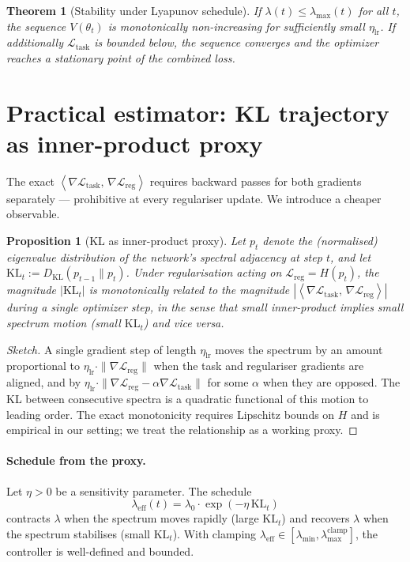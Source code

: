 \documentclass[11pt,a4paper]{article}
\newtheorem{theorem}{Theorem}
\newtheorem{proposition}{Proposition}
\newcommand{\inner}[2]{\left\langle #1,\, #2 \right\rangle}
\newcommand{\Ltask}{\mathcal{L}_{\text{task}}}
\newcommand{\Lreg}{\mathcal{L}_{\text{reg}}}
\begin{document}
\begin{theorem}[Stability under Lyapunov schedule]
\label{thm:stability}
If $\lambda(t) \leq \lambda_{\max}(t)$ for all $t$, the sequence
$V(\theta_t)$ is monotonically non-increasing for sufficiently small
$\eta_{\text{lr}}$. If additionally $\Ltask$ is bounded below, the
sequence converges and the optimizer reaches a stationary point of the
combined loss.
\end{theorem}

\section{Practical estimator: KL trajectory as inner-product proxy}

The exact $\inner{\nabla\Ltask}{\nabla\Lreg}$ requires backward
passes for both gradients separately --- prohibitive at every
regulariser update. We introduce a cheaper observable.

\begin{proposition}[KL as inner-product proxy]
\label{prop:kl-proxy}
Let $p_t$ denote the (normalised) eigenvalue distribution of the
network's spectral adjacency at step $t$, and let
$\mathrm{KL}_t := D_{\mathrm{KL}}(p_{t-1} \| p_t)$. Under regularisation
acting on $\Lreg = H(p_t)$, the magnitude $|\mathrm{KL}_t|$ is
monotonically related to the magnitude
$|\inner{\nabla\Ltask}{\nabla\Lreg}|$ during a single optimizer step,
in the sense that small inner-product implies small spectrum motion
(small $\mathrm{KL}_t$) and vice versa.
\end{proposition}

\begin{proof}[Sketch]
A single gradient step of length $\eta_{\text{lr}}$ moves the spectrum
by an amount proportional to $\eta_{\text{lr}} \cdot \|\nabla \Lreg\|$
when the task and regulariser gradients are aligned, and by
$\eta_{\text{lr}} \cdot \|\nabla \Lreg - \alpha \nabla\Ltask\|$ for
some $\alpha$ when they are opposed. The KL between consecutive
spectra is a quadratic functional of this motion to leading order.
The exact monotonicity requires Lipschitz bounds on $H$ and is
empirical in our setting; we treat the relationship as a working
proxy.
\end{proof}

\paragraph{Schedule from the proxy.}
Let $\eta > 0$ be a sensitivity parameter. The schedule
\begin{equation}
\lambda_{\text{eff}}(t) = \lambda_0 \cdot \exp(-\eta\, \mathrm{KL}_t)
\label{eq:schedule}
\end{equation}
contracts $\lambda$ when the spectrum moves rapidly (large
$\mathrm{KL}_t$) and recovers $\lambda$ when the spectrum stabilises
(small $\mathrm{KL}_t$). With clamping
$\lambda_{\text{eff}} \in [\lambda_{\min}, \lambda_{\max}^{\text{clamp}}]$,
the controller is well-defined and bounded.
\end{document}
